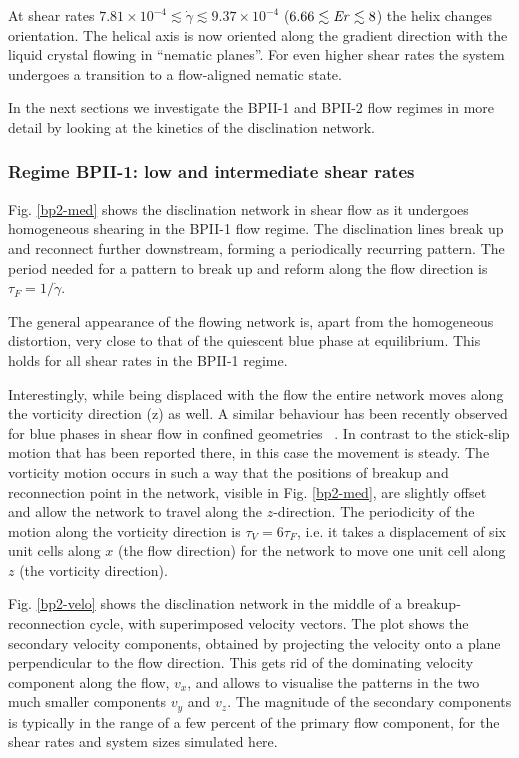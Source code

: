\documentclass[8.5pt,twoside,twocolumn]{article}
\newcommand{\e}[1]{\times10^{#1}}
\newcommand{\gd}{\dot{\gamma}}
\begin{document}
At shear rates $7.81\e{-4}\lesssim\gd \lesssim 9.37\e{-4}$ ($6.66\lesssim {\it Er} \lesssim 8$) the helix changes orientation.
The helical axis is now oriented along the gradient direction with
the liquid crystal flowing in ``nematic planes''. For even higher shear rates
the system undergoes a transition to a flow-aligned nematic state.

In the next sections we investigate the BPII-1 and BPII-2 flow regimes in more detail 
by looking at the kinetics of the disclination network.

\subsubsection{Regime BPII-1: low and intermediate shear rates }

Fig. \ref{bp2-med} shows the disclination network in shear flow as
it undergoes homogeneous shearing in the BPII-1 flow regime. 
The disclination lines break up and 
reconnect further downstream, forming a periodically recurring pattern. The
period needed for a pattern to break up and 
reform along the flow direction is $\tau_F = 1/\gd$.

The general appearance of the flowing network is, apart from the homogeneous distortion,
very close to that of the quiescent blue phase at equilibrium. This holds for all
shear rates in the BPII-1 regime.

Interestingly, while being displaced with the flow the entire network moves 
along the vorticity direction (z) as well.  A similar behaviour has been recently 
observed for blue phases in shear flow in confined geometries ~\cite{Henrich:2012b}.
In contrast to the stick-slip motion that has been reported there,
in this case the movement is steady. 
The vorticity motion occurs in such a way that the positions of breakup and reconnection 
point in the network, visible in Fig. \ref{bp2-med}, are slightly offset and allow the network 
to travel along the $z$-direction. The periodicity of the motion along the vorticity direction
is $\tau_V=6\tau_F$, 
i.e. it takes a displacement of six unit cells along $x$ (the flow direction) 
for the network to move one unit cell along $z$ (the vorticity direction).

Fig. \ref{bp2-velo} shows the disclination network in the middle of a breakup-reconnection
cycle, with superimposed velocity vectors.
The plot shows the secondary velocity components, obtained by projecting the
velocity onto a plane perpendicular to the flow direction.
This gets rid of the dominating velocity component along the flow, $v_x$, and 
allows to visualise the patterns in the 
two much smaller components $v_y$ and $v_z$.
The magnitude of the secondary components is typically in the range of a 
few percent of the primary flow component, for the shear rates 
and system sizes simulated here.
\end{document}
